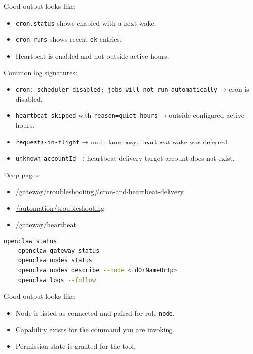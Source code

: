 Good output looks like:

\begin{itemize}
  \item \texttt{cron.status} shows enabled with a next wake.
  \item \texttt{cron runs} shows recent \texttt{ok} entries.
  \item Heartbeat is enabled and not outside active hours.
\end{itemize}


Common log signatures:

\begin{itemize}
  \item \texttt{cron: scheduler disabled; jobs will not run automatically} → cron is disabled.
  \item \texttt{heartbeat skipped} with \texttt{reason=quiet-hours} → outside configured active hours.
  \item \texttt{requests-in-flight} → main lane busy; heartbeat wake was deferred.
  \item \texttt{unknown accountId} → heartbeat delivery target account does not exist.
\end{itemize}


Deep pages:

\begin{itemize}
  \item \href{/gateway/troubleshooting\#cron-and-heartbeat-delivery}{/gateway/troubleshooting\#cron-and-heartbeat-delivery}
  \item \href{/automation/troubleshooting}{/automation/troubleshooting}
  \item \href{/gateway/heartbeat}{/gateway/heartbeat}
\end{itemize}



\begin{lstlisting}[language=bash]
    openclaw status
    openclaw gateway status
    openclaw nodes status
    openclaw nodes describe --node <idOrNameOrIp>
    openclaw logs --follow
\end{lstlisting}


Good output looks like:

\begin{itemize}
  \item Node is listed as connected and paired for role \texttt{node}.
  \item Capability exists for the command you are invoking.
  \item Permission state is granted for the tool.
\end{itemize}


